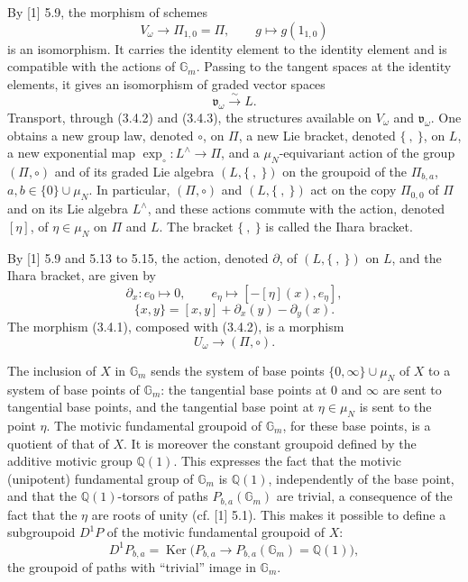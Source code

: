 \documentclass[10pt,a4paper]{article}
\newcommand{\Gm}{\mathbb G_m}
\newcommand{\muN}{\mu_N}
\newcommand{\Q}{\mathbb Q}
\newcommand{\Ker}{\operatorname{Ker}}
\newcommand{\vomega}{\mathfrak v_\omega}
\newcommand{\Lhat}{L^{\wedge}}
\theoremstyle{deligne}
\newcommand{\heading}[1]{\vspace{0.65em}\noindent{\bfseries #1}\quad}
\begin{document}
By [1] 5.9, the morphism of schemes
\[
\tag{3.4.2}
V_\omega\longrightarrow\Pi_{1,0}=\Pi,\qquad g\longmapsto g(1_{1,0})
\]
is an isomorphism. It carries the identity element to the identity element and is compatible with the actions of \(\Gm\). Passing to the tangent spaces at the identity elements, it gives an isomorphism of graded vector spaces
\[
\tag{3.4.3}
\vomega\overset{\sim}{\longrightarrow}L.
\]
Transport, through (3.4.2) and (3.4.3), the structures available on \(V_\omega\) and \(\vomega\). One obtains a new group law, denoted \(\circ\), on \(\Pi\), a new Lie bracket, denoted \(\{\ ,\ \}\), on \(L\), a new exponential map \(\exp_\circ:\Lhat\to\Pi\), and a \(\muN\)-equivariant action of the group \((\Pi,\circ)\) and of its graded Lie algebra \((L,\{\ ,\ \})\) on the groupoid of the \(\Pi_{b,a}\), \(a,b\in\{0\}\cup\muN\). In particular, \((\Pi,\circ)\) and \((L,\{\ ,\ \})\) act on the copy \(\Pi_{0,0}\) of \(\Pi\) and on its Lie algebra \(\Lhat\), and these actions commute with the action, denoted \([\eta]\), of \(\eta\in\muN\) on \(\Pi\) and \(L\). The bracket \(\{\ ,\ \}\) is called the Ihara bracket.

By [1] 5.9 and 5.13 to 5.15, the action, denoted \(\partial\), of \((L,\{\ ,\ \})\) on \(L\), and the Ihara bracket, are given by
\[
\tag{3.4.4}
\partial_x:e_0\longmapsto0,\qquad e_\eta\longmapsto[-[\eta](x),e_\eta],
\]
\[
\tag{3.4.5}
\{x,y\}=[x,y]+\partial_x(y)-\partial_y(x).
\]
The morphism (3.4.1), composed with (3.4.2), is a morphism
\[
\tag{3.4.6}
U_\omega\longrightarrow(\Pi,\circ).
\]

\heading{3.5.} The inclusion of \(X\) in \(\Gm\) sends the system of base points \(\{0,\infty\}\cup\muN\) of \(X\) to a system of base points of \(\Gm\): the tangential base points at \(0\) and \(\infty\) are sent to tangential base points, and the tangential base point at \(\eta\in\muN\) is sent to the point \(\eta\). The motivic fundamental groupoid of \(\Gm\), for these base points, is a quotient of that of \(X\). It is moreover the constant groupoid defined by the additive motivic group \(\Q(1)\). This expresses the fact that the motivic (unipotent) fundamental group of \(\Gm\) is \(\Q(1)\), independently of the base point, and that the \(\Q(1)\)-torsors of paths \(P_{b,a}(\Gm)\) are trivial, a consequence of the fact that the \(\eta\) are roots of unity (cf. [1] 5.1). This makes it possible to define a subgroupoid \(D^1P\) of the motivic fundamental groupoid of \(X\):
\[
\tag{3.5.1}
D^1P_{b,a}=\Ker\bigl(P_{b,a}\longrightarrow P_{b,a}(\Gm)=\Q(1)\bigr),
\]
the groupoid of paths with ``trivial'' image in \(\Gm\).
\end{document}
